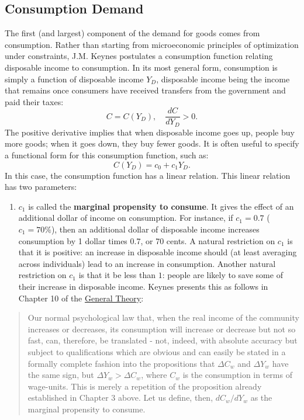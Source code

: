\documentclass[]{book}
\providecommand{\tightlist}{%
  \setlength{\itemsep}{0pt}\setlength{\parskip}{0pt}}
\begin{document}
\subsection{Consumption Demand}\label{consumption-demand}

The first (and largest) component of the demand for goods comes from
consumption. Rather than starting from microeconomic principles of
optimization under constraints, J.M. Keynes postulates a consumption
function relating disposable income to consumption. In its most general
form, consumption is simply a function of disposable income \(Y_D\),
disposable income being the income that remains once consumers have
received transfers from the government and paid their taxes:
\[C=C(Y_D), \quad \frac{dC}{dY_D}>0.\] The positive derivative implies
that when disposable income goes up, people buy more goods; when it goes
down, they buy fewer goods. It is often useful to specify a functional
form for this consumption function, such as: \[C(Y_D)=c_0+c_1Y_D.\] In
this case, the consumption function has a linear relation. This linear
relation has two parameters:

\begin{enumerate}
\def\labelenumi{\arabic{enumi}.}
\tightlist
\item
  \(c_1\) is called the \textbf{marginal propensity to consume}. It
  gives the effect of an additional dollar of income on consumption. For
  instance, if \(c_1=0.7\) (\(c_1=70\%\)), then an additional dollar of
  disposable income increases consumption by 1 dollar times 0.7, or 70
  cents. A natural restriction on \(c_1\) is that it is positive: an
  increase in disposable income should (at least averaging across
  individuals) lead to an increase in consumption. Another natural
  restriction on \(c_1\) is that it be less than \(1\): people are
  likely to save some of their increase in disposable income. Keynes
  presents this as follows in Chapter 10 of the
  \href{http://cas2.umkc.edu/economics/people/facultypages/kregel/courses/econ645/winter2011/generaltheory.pdf}{General
  Theory}:
\end{enumerate}

\begin{quote}
Our normal psychological law that, when the real income of the community
increases or decreases, its consumption will increase or decrease but
not so fast, can, therefore, be translated - not, indeed, with absolute
accuracy but subject to qualifications which are obvious and can easily
be stated in a formally complete fashion into the propositions that
\(\Delta C_w\) and \(\Delta Y_w\) have the same sign, but
\(\Delta Y_w > \Delta C_w\), where \(C_w\) is the consumption in terms
of wage-units. This is merely a repetition of the proposition already
established in Chapter 3 above. Let us define, then, \(dC_w/dY_w\) as
the marginal propensity to consume.
\end{quote}
\end{document}
